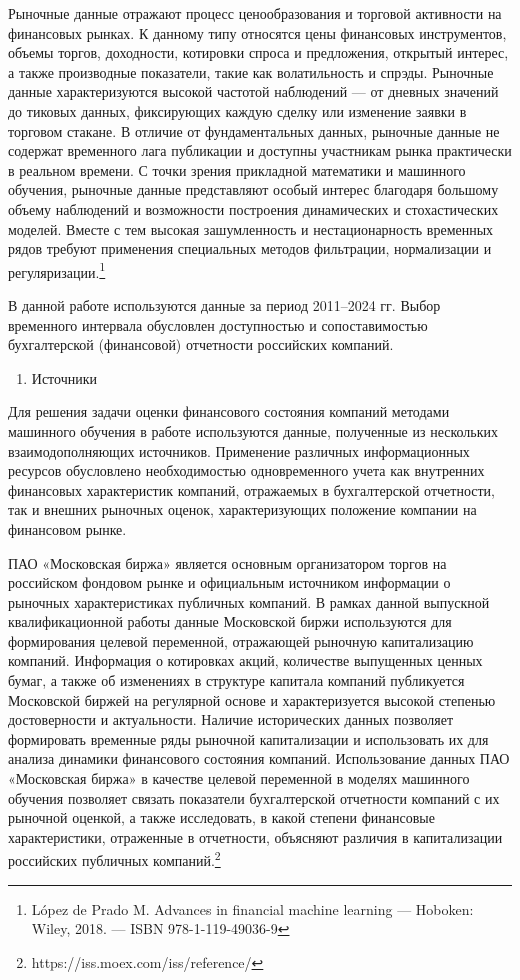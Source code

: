 \documentclass[
]{article}
\begin{document}
Рыночные данные отражают процесс ценообразования и торговой активности на финансовых рынках. К данному типу относятся цены финансовых инструментов, объемы торгов, доходности, котировки спроса и предложения, открытый интерес, а также производные показатели, такие как волатильность и спрэды. Рыночные данные характеризуются высокой частотой наблюдений --- от дневных значений до тиковых данных, фиксирующих каждую сделку или изменение заявки в торговом стакане. В отличие от фундаментальных данных, рыночные данные не содержат временного лага публикации и доступны участникам рынка практически в реальном времени. С точки зрения прикладной математики и машинного обучения, рыночные данные представляют особый интерес благодаря большому объему наблюдений и возможности построения динамических и стохастических моделей. Вместе с тем высокая зашумленность и нестационарность временных рядов требуют применения специальных методов фильтрации, нормализации и регуляризации.\footnote{López de Prado M. Advances in financial machine learning --- Hoboken: Wiley, 2018. --- ISBN 978-1-119-49036-9}

В данной работе используются данные за период 2011--2024 гг. Выбор временного интервала обусловлен доступностью и сопоставимостью бухгалтерской (финансовой) отчетности российских компаний.

\begin{enumerate}
\def\labelenumi{\alph{enumi}.}
\item
  Источники
\end{enumerate}

Для решения задачи оценки финансового состояния компаний методами машинного обучения в работе используются данные, полученные из нескольких взаимодополняющих источников. Применение различных информационных ресурсов обусловлено необходимостью одновременного учета как внутренних финансовых характеристик компаний, отражаемых в бухгалтерской отчетности, так и внешних рыночных оценок, характеризующих положение компании на финансовом рынке.

ПАО «Московская биржа» является основным организатором торгов на российском фондовом рынке и официальным источником информации о рыночных характеристиках публичных компаний. В рамках данной выпускной квалификационной работы данные Московской биржи используются для формирования целевой переменной, отражающей рыночную капитализацию компаний. Информация о котировках акций, количестве выпущенных ценных бумаг, а также об изменениях в структуре капитала компаний публикуется Московской биржей на регулярной основе и характеризуется высокой степенью достоверности и актуальности. Наличие исторических данных позволяет формировать временные ряды рыночной капитализации и использовать их для анализа динамики финансового состояния компаний. Использование данных ПАО «Московская биржа» в качестве целевой переменной в моделях машинного обучения позволяет связать показатели бухгалтерской отчетности компаний с их рыночной оценкой, а также исследовать, в какой степени финансовые характеристики, отраженные в отчетности, объясняют различия в капитализации российских публичных компаний.\footnote{https://iss.moex.com/iss/reference/}
\end{document}
